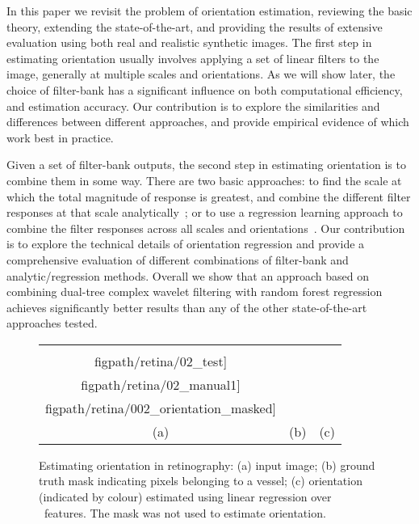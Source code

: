 In this paper we revisit the problem of orientation estimation, reviewing the basic theory, extending the state-of-the-art, and providing the results of extensive evaluation using both real and realistic synthetic images. The first step in estimating orientation usually involves applying a set of linear filters to the image, generally at multiple scales and orientations. As we will show later, the choice of filter-bank has a significant influence on both computational efficiency, and estimation accuracy. Our contribution is to explore the similarities and differences between different approaches, and provide empirical evidence of which work best in practice.

Given a set of filter-bank outputs, the second step in estimating orientation is to combine them in some way. There are two basic approaches: to find the scale at which the total magnitude of response is greatest, and combine the different filter responses at that scale analytically~\cite{Karssemeijer_teBrake_TMI96,Mei_etal_IVC09}; or to use a regression learning approach to combine the filter responses across all scales and orientations~\cite{Berks_etal_IPMI11}. Our contribution is to explore the technical details of orientation regression and provide a comprehensive evaluation of different combinations of filter-bank and analytic/regression methods. Overall we show that an approach based on combining dual-tree complex wavelet filtering with random forest regression achieves significantly better results than any of the other state-of-the-art approaches tested.

\begin{figure}[t]
\centering
\begin{tabular}{c c c}
\texttt{[image: \\figpath/retina/02\_test]} &
\texttt{[image: \\figpath/retina/02\_manual1]} &
\texttt{[image: \\figpath/retina/002\_orientation\_masked]} \\
(a) & (b) & (c) \\
\end{tabular}
%
\caption{Estimating orientation in retinography: %
(a) input image; %
(b) ground truth mask indicating pixels belonging to a vessel; %
(c) orientation (indicated by colour) estimated using linear regression over \dtcwt~features. The mask was not used to estimate orientation. %
}
\label{f:retinography}
\end{figure}




